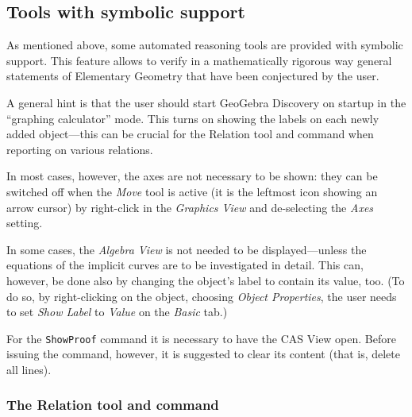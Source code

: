 \documentclass{article}
\begin{document}
\subsection{Tools with symbolic support}

As mentioned above, some automated reasoning tools are provided with symbolic support. This feature allows to verify in a mathematically rigorous way general statements of Elementary Geometry that have been conjectured by the user.

A general hint is that the user should start GeoGebra Discovery on startup in the ``graphing calculator'' mode. This turns on showing the labels on each newly added object---this can be crucial for the Relation tool and command when reporting on various relations. 

In most cases, however, the axes are not necessary to be shown: they can be switched off when the \textit{Move} tool is active (it is the leftmost icon showing an arrow cursor) by right-click in the \textit{Graphics View} and de-selecting the \textit{Axes} setting.

In some cases, the \textit{Algebra View} is not needed to be displayed---unless the equations of the implicit curves are to be investigated in detail. This can,  however, be done also by changing the object's label to contain its value, too. (To do so, by right-clicking on the object, choosing \textit{Object Properties}, the user needs to set \textit{Show Label} to \textit{Value} on the \textit{Basic} tab.)

For the \texttt{ShowProof} command it is necessary to have the CAS View open. Before issuing the command, however, it is suggested to clear its content (that is, delete all lines).


\subsubsection{The Relation tool and command}
\end{document}

